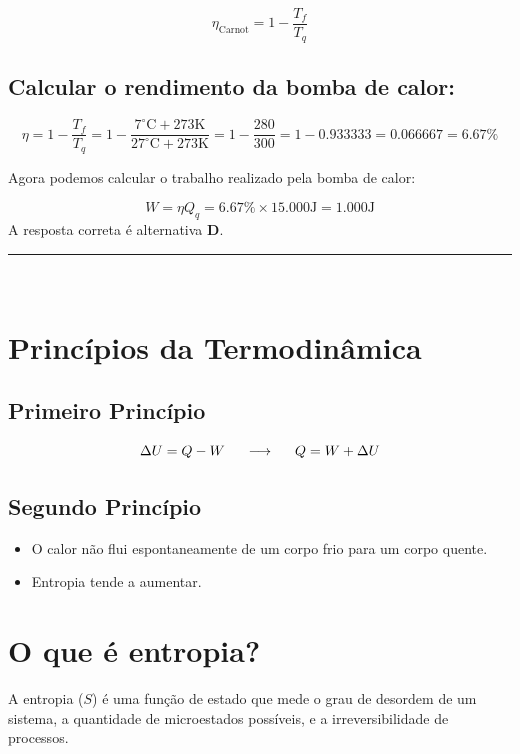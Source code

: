 \begin{flushleft}
\[
\eta_{\text{Carnot}} = 1 - \frac{T_f}{T_q}
\]

\subsection*{Calcular o rendimento da bomba de calor:}

\[
\eta = 1 - \frac{T_f}{T_q} = 1 - \frac{7^{\circ}\textrm{C} + 273\textrm{K}}{27^{\circ}\textrm{C}+ 273\textrm{K}} = 1 - \frac{280}{300} = 1 - 0.933333 = 0.066667 = 6.67\%
\]

Agora podemos calcular o trabalho realizado pela bomba de calor:

\[
  W = \eta Q_q = 6.67\% \times 15.000 \textrm{J} = 1.000 \textrm{J}
\]
A resposta correta é alternativa \colorbox{green!50}{\textbf{D}}.
\end{flushleft}

\noindent\rule{\linewidth}{0.6pt}\\

\section*{Princ\'ipios da Termodinâmica}

\subsection*{Primeiro Princípio}
\begin{equation*}
    \Delta U = Q - W   \hspace{0.5cm} \longrightarrow \hspace{0.5cm} Q = W + \Delta U
\end{equation*}
\subsection*{Segundo Princípio}
\begin{itemize}
    \item O calor não flui espontaneamente de um corpo frio para um corpo quente.
    \item Entropia tende a aumentar.
\end{itemize}

\section*{O que é entropia?}
A entropia (\(S\)) é uma função de estado que mede o grau de desordem de um sistema, a quantidade de microestados possíveis, e a irreversibilidade de processos.

